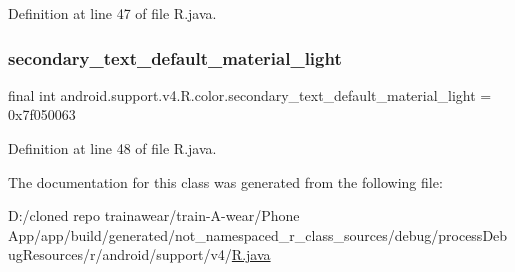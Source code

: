 Definition at line 47 of file R.\+java.

\mbox{\label{classandroid_1_1support_1_1v4_1_1_r_1_1color_a3cc6c4f9f00257e09e9f62fbbcef9823}} 
\subsubsection{\texorpdfstring{secondary\_text\_default\_material\_light}{secondary\_text\_default\_material\_light}}
{\footnotesize\ttfamily final int android.\+support.\+v4.\+R.\+color.\+secondary\+\_\+text\+\_\+default\+\_\+material\+\_\+light = 0x7f050063\hspace{0.3cm}{\ttfamily [static]}}



Definition at line 48 of file R.\+java.



The documentation for this class was generated from the following file\+:\begin{DoxyCompactItemize}
\item 
D\+:/cloned repo trainawear/train-\/\+A-\/wear/\+Phone App/app/build/generated/not\+\_\+namespaced\+\_\+r\+\_\+class\+\_\+sources/debug/process\+Debug\+Resources/r/android/support/v4/\mbox{\hyperlink{process_debug_resources_2r_2android_2support_2v4_2_r_8java}{R.\+java}}\end{DoxyCompactItemize}
